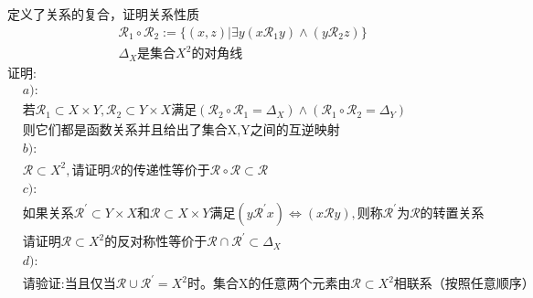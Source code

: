 \begin{exercise}
    定义了关系的复合，证明关系性质
    \label{def:b1-c1-s3-q1}
    \begin{align*}
        &\mathcal{R}_1 \circ \mathcal{R}_2:=\{(x,z)|\exists y(x\mathcal{R}_1y)\land (y\mathcal{R}_2 z)\}\\  
        &\Delta_X \text{是集合}X^2\text{的对角线}   
    \end{align*}
    证明:
    \begin{align*}
        &a):\\
        &\text{若} \mathcal{R}_1\subset X\times Y,\mathcal{R}_2\subset Y\times X\text{满足}(\mathcal{R}_2\circ\mathcal{R}_1=\Delta_X)\land(\mathcal{R}_1\circ\mathcal{R}_2=\Delta_Y)\\
        &\text{则它们都是函数关系并且给出了集合X,Y之间的互逆映射}\\
        &b):\\
        &\mathcal{R}\subset X^2,\text{请证明}\mathcal{R}\text{的传递性等价于}\mathcal{R}\circ\mathcal{R}\subset\mathcal{R}\\
        &c):\\
        &\text{如果关系}\mathcal{R}^\prime\subset Y\times X\text{和}\mathcal{R}\subset X\times Y\text{满足}(y\mathcal{R}^\prime x)\Leftrightarrow (x\mathcal{R}y),\text{则称}\mathcal{R}^\prime\text{为}\mathcal{R}\text{的转置关系}\\
        &\text{请证明}\mathcal{R}\subset X^2\text{的反对称性等价于}\mathcal{R}\cap \mathcal{R}^\prime \subset \Delta_X\\
        &d):\\
        &\text{请验证:当且仅当}\mathcal{R}\cup \mathcal{R}^\prime=X^2\text{时。集合X的任意两个元素由}\mathcal{R}\subset X^2\text{相联系（按照任意顺序）}
    \end{align*}
\end{exercise}
